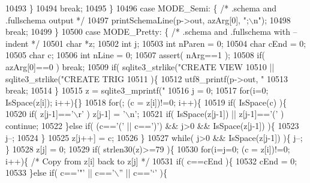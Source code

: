 \begin{DoxyCode}
{{{{{{10493       \}
10494       \textcolor{keywordflow}{break};
10495     \}
10496     \textcolor{keywordflow}{case} MODE_Semi: \{   \textcolor{comment}{/* .schema and .fullschema output */}
10497       printSchemaLine(p->out, azArg[0], \textcolor{stringliteral}{";\(\backslash\)n"});
10498       \textcolor{keywordflow}{break};
10499     \}
10500     \textcolor{keywordflow}{case} MODE_Pretty: \{  \textcolor{comment}{/* .schema and .fullschema with --indent */}
10501       \textcolor{keywordtype}{char} *z;
10502       \textcolor{keywordtype}{int} j;
10503       \textcolor{keywordtype}{int} nParen = 0;
10504       \textcolor{keywordtype}{char} cEnd = 0;
10505       \textcolor{keywordtype}{char} c;
10506       \textcolor{keywordtype}{int} nLine = 0;
10507       assert( nArg==1 );
10508       \textcolor{keywordflow}{if}( azArg[0]==0 ) \textcolor{keywordflow}{break};
10509       \textcolor{keywordflow}{if}( sqlite3_strlike(\textcolor{stringliteral}{"CREATE VIEW%
10510        || sqlite3_strlike(\textcolor{stringliteral}{"CREATE TRIG%
10511       )\{
10512         utf8_printf(p->out, \textcolor{stringliteral}{"%
10513         \textcolor{keywordflow}{break};
10514       \}
10515       z = sqlite3_mprintf(\textcolor{stringliteral}{"%
10516       j = 0;
10517       \textcolor{keywordflow}{for}(i=0; IsSpace(z[i]); i++)\{\}
10518       \textcolor{keywordflow}{for}(; (c = z[i])!=0; i++)\{
10519         \textcolor{keywordflow}{if}( IsSpace(c) )\{
10520           \textcolor{keywordflow}{if}( z[j-1]==\textcolor{charliteral}{'\(\backslash\)r'} ) z[j-1] = \textcolor{charliteral}{'\(\backslash\)n'};
10521           \textcolor{keywordflow}{if}( IsSpace(z[j-1]) || z[j-1]==\textcolor{charliteral}{'('} ) \textcolor{keywordflow}{continue};
10522         \}\textcolor{keywordflow}{else} \textcolor{keywordflow}{if}( (c==\textcolor{charliteral}{'('} || c==\textcolor{charliteral}{')'}) && j>0 && IsSpace(z[j-1]) )\{
10523           j--;
10524         \}
10525         z[j++] = c;
10526       \}
10527       \textcolor{keywordflow}{while}( j>0 && IsSpace(z[j-1]) )\{ j--; \}
10528       z[j] = 0;
10529       \textcolor{keywordflow}{if}( strlen30(z)>=79 )\{
10530         \textcolor{keywordflow}{for}(i=j=0; (c = z[i])!=0; i++)\{ \textcolor{comment}{/* Copy from z[i] back to z[j] */}
10531           \textcolor{keywordflow}{if}( c==cEnd )\{
10532             cEnd = 0;
10533           \}\textcolor{keywordflow}{else} \textcolor{keywordflow}{if}( c==\textcolor{charliteral}{'"'} || c==\textcolor{charliteral}{'\(\backslash\)''} || c==\textcolor{charliteral}{'`'} )\{
}}}}}}}}}}
\end{DoxyCode}
